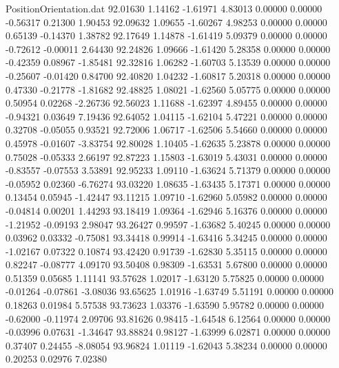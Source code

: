 \begin{filecontents}{PositionOrientation.dat}
  92.01630    1.14162   -1.61971     4.83013    0.00000    0.00000   -0.56317    0.21300    1.90453
  92.09632    1.09655   -1.60267     4.98253    0.00000    0.00000    0.65139   -0.14370    1.38782
  92.17649    1.14878   -1.61419     5.09379    0.00000    0.00000   -0.72612   -0.00011    2.64430
  92.24826    1.09666   -1.61420     5.28358    0.00000    0.00000   -0.42359    0.08967   -1.85481
  92.32816    1.06282   -1.60703     5.13539    0.00000    0.00000   -0.25607   -0.01420    0.84700
  92.40820    1.04232   -1.60817     5.20318    0.00000    0.00000    0.47330   -0.21778   -1.81682
  92.48825    1.08021   -1.62560     5.05775    0.00000    0.00000    0.50954    0.02268   -2.26736
  92.56023    1.11688   -1.62397     4.89455    0.00000    0.00000   -0.94321    0.03649    7.19436
  92.64052    1.04115   -1.62104     5.47221    0.00000    0.00000    0.32708   -0.05055    0.93521
  92.72006    1.06717   -1.62506     5.54660    0.00000    0.00000    0.45978   -0.01607   -3.83754
  92.80028    1.10405   -1.62635     5.23878    0.00000    0.00000    0.75028   -0.05333    2.66197
  92.87223    1.15803   -1.63019     5.43031    0.00000    0.00000   -0.83557   -0.07553    3.53891
  92.95233    1.09110   -1.63624     5.71379    0.00000    0.00000   -0.05952    0.02360   -6.76274
  93.03220    1.08635   -1.63435     5.17371    0.00000    0.00000    0.13454    0.05945   -1.42447
  93.11215    1.09710   -1.62960     5.05982    0.00000    0.00000   -0.04814    0.00201    1.44293
  93.18419    1.09364   -1.62946     5.16376    0.00000    0.00000   -1.21952   -0.09193    2.98047
  93.26427    0.99597   -1.63682     5.40245    0.00000    0.00000    0.03962    0.03332   -0.75081
  93.34418    0.99914   -1.63416     5.34245    0.00000    0.00000   -1.02167    0.07322    0.10874
  93.42420    0.91739   -1.62830     5.35115    0.00000    0.00000    0.82247   -0.08777    4.09170
  93.50408    0.98309   -1.63531     5.67800    0.00000    0.00000    0.51359    0.05685    1.11141
  93.57628    1.02017   -1.63120     5.75825    0.00000    0.00000   -0.01264   -0.07861   -3.08036
  93.65625    1.01916   -1.63749     5.51191    0.00000    0.00000    0.18263    0.01984    5.57538
  93.73623    1.03376   -1.63590     5.95782    0.00000    0.00000   -0.62000   -0.11974    2.09706
  93.81626    0.98415   -1.64548     6.12564    0.00000    0.00000   -0.03996    0.07631   -1.34647
  93.88824    0.98127   -1.63999     6.02871    0.00000    0.00000    0.37407    0.24455   -8.08054
  93.96824    1.01119   -1.62043     5.38234    0.00000    0.00000    0.20253    0.02976    7.02380

\end{filecontents}
